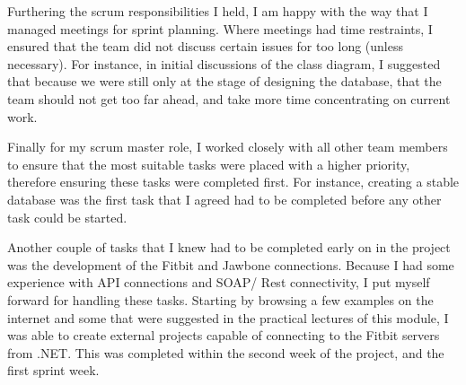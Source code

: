 Furthering the scrum responsibilities I held, I am happy with the way that I managed meetings for sprint planning. Where meetings had time restraints, I ensured that the team did not discuss certain issues for too long (unless necessary). For instance, in initial discussions of the class diagram, I suggested that because we were still only at the stage of designing the database, that the team should not get too far ahead, and take more time concentrating on current work. \par
Finally for my scrum master role, I worked closely with all other team members to ensure that the most suitable tasks were placed with a higher priority, therefore ensuring these tasks were completed first. For instance, creating a stable database was the first task that I agreed had to be completed before any other task could be started.\par
Another couple of tasks that I knew had to be completed early on in the project was the development of the Fitbit and Jawbone connections. Because I had some experience with API connections and SOAP/ Rest connectivity, I put myself forward for handling these tasks. Starting by browsing a few examples on the internet and some that were suggested in the practical lectures of this module, I was able to create external projects capable of connecting to the Fitbit servers from .NET. This was completed within the second week of the project, and the first sprint week.
